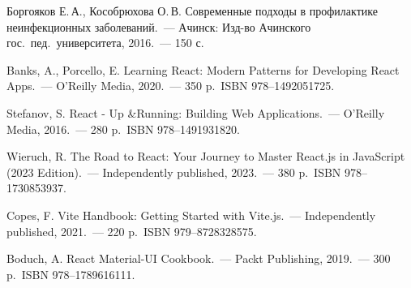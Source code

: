 \begin{thebibliography}{99}

     Боргояков Е.\,А., Кособрюхова О.\,В. Современные подходы в профилактике неинфекционных заболеваний.\ — Ачинск: Изд-во Ачинского гос.\ пед.\ университета, 2016.\ — 150 с.

     Banks, A., Porcello, E. Learning React: Modern Patterns for Developing React Apps.\ — O'Reilly Media, 2020.\ — 350 p.\ ISBN 978--1492051725.

     Stefanov, S. React - Up \&Running: Building Web Applications.\ — O'Reilly Media, 2016.\ — 280 p.\ ISBN 978--1491931820.

     Wieruch, R. The Road to React: Your Journey to Master React.js in JavaScript (2023 Edition).\ — Independently published, 2023.\ — 380 p.\ ISBN 978--1730853937.

     Copes, F. Vite Handbook: Getting Started with Vite.js.\ — Independently published, 2021.\ — 220 p.\ ISBN 979--8728328575.

     Boduch, A. React Material-UI Cookbook.\ — Packt Publishing, 2019.\ — 300 p.\ ISBN 978--1789616111.

\end{thebibliography}
